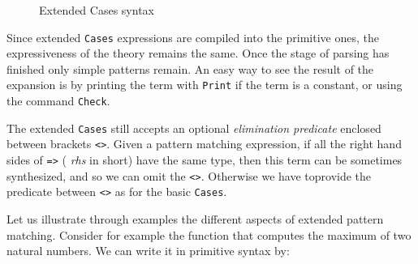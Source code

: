 \begin{figure}[t]
\caption{Extended Cases syntax}
\label{cases-grammar}
\end{figure}

Since extended {\tt Cases} expressions are compiled into the primitive
ones, the expressiveness of the theory remains the same. Once the
stage of parsing has finished only simple patterns remain. An easy way
to see the result of the expansion is by printing the term with
\texttt{Print} if the term is a constant, or using the command
\texttt{Check}.

The extended \texttt{Cases} still accepts an optional {\em elimination
predicate} enclosed between brackets \texttt{<>}.  Given a pattern
matching expression, if all the right hand sides of \texttt{=>} ({\em
rhs} in short) have the same type, then this term can be sometimes
synthesized, and so we can omit the \texttt{<>}.  Otherwise we have
toprovide the predicate between \texttt{<>} as for the basic
\texttt{Cases}.

Let us illustrate through examples the different aspects of extended
pattern matching. Consider for example the function that computes the
maximum of two natural numbers. We can write it in primitive syntax
by:

